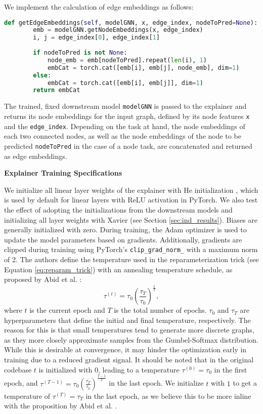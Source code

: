 We implement the calculation of edge embeddings as follows:
\begin{lstlisting}[language=Python, caption=Implementation of edge embedding calculation, label=lst:edge_embedding_calc]
    def getEdgeEmbeddings(self, modelGNN, x, edge_index, nodeToPred=None):
        emb = modelGNN.getNodeEmbeddings(x, edge_index)
        i, j = edge_index[0], edge_index[1]
        
        if nodeToPred is not None:
            node_emb = emb[nodeToPred].repeat(len(i), 1)
            embCat = torch.cat([emb[i], emb[j], node_emb], dim=1)
        else:
            embCat = torch.cat([emb[i], emb[j]], dim=1)
        return embCat
\end{lstlisting}
The trained, fixed downstream model \lstinline|modelGNN| is passed to the explainer and returns its node embeddings for the input graph, defined by its node features \lstinline|x| and the \lstinline|edge_index|. Depending on the task at hand, the node embeddings of each two connected nodes, as well as the node embeddings of the node to be predicted \lstinline|nodeToPred| in the case of a node task, are concatenated and returned as edge embeddings. \bigskip

\textbf{Explainer Training Specifications}\par
We initialize all linear layer weights of the explainer with He initialization \cite{he2015delving}, which is used by default for linear layers with ReLU activation in PyTorch. We also test the effect of adopting the initializations from the downstream models and initializing all layer weights with Xavier \cite{glorot2010understanding} (see Section \ref{sec:ind_results}). Biases are generally initialized with zero. During training, the Adam optimizer \cite{kingma2014adam} is used to update the model parameters based on gradients. Additionally, gradients are clipped during training using PyTorch's \lstinline|clip_grad_norm_| with a maximum norm of 2. The authors define the temperature used in the reparameterization trick (see Equation \ref{eq:reparam_trick}) with an annealing temperature schedule, as proposed by Abid et al. \cite{abid2019concrete}:
\begin{equation}
    \tau^{(t)} = \tau_0(\frac{\tau_T}{\tau_0})^{\frac{t}{T}},
\end{equation} 
where $t$ is the current epoch and $T$ is the total number of epochs. $\tau_0$ and $\tau_T$ are hyperparameters that define the initial and final temperature, respectively.
The reason for this is that small temperatures tend to generate more discrete graphs, as they more closely approximate samples from the Gumbel-Softmax distribution. While this is desirable at convergence, it may hinder the optimization early in training due to a reduced gradient signal. It should be noted that in the original codebase $t$ is initialized with $0$, leading to a temperature $\tau^{(0)} = \tau_0$ in the first epoch, and $\tau^{(T-1)} = \tau_0(\frac{\tau_T}{\tau_0})^{\frac{T-1}{T}}$ in the last epoch. We initialize $t$ with $1$ to get a temperature of $\tau^{(T)} = \tau_T$ in the last epoch, as we believe this to be more inline with the proposition by Abid et al. \cite{abid2019concrete}. \bigskip

